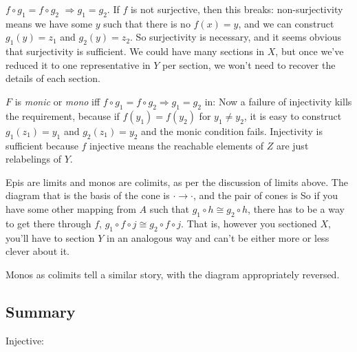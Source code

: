 \documentclass[11pt]{article}
\begin{document}

$f\circ g_1 = f\circ g_2$ $\Rightarrow g_1 = g_2$. If $f$ is not surjective, then
this breaks: non-surjectivity means we have some $y$ such that there is no $f(x)=y$,
and we can construct $g_1(y)=z_1$ and $g_2(y)=z_2$. So surjectivity is necessary, and
it seems obvious that surjectivity is sufficient. We could have many sections in $X$, but
once we've reduced it to one representative in $Y$ per section, we won't need to recover
the details of each section.

$F$ is {\em monic} or {\em mono} iff $f \circ g_1 = f \circ g_2 \Rightarrow g_1 = g_2$ in:
Now a failure of injectivity kills the requirement, because if $f(y_1)=f(y_2)$ for
$y_1\neq y_2$, it is easy to construct $g_1(z_1)=y_1$ and $g_2(z_1)=y_2$ and the monic
condition fails. Injectivity is sufficient because $f$ injective means the reachable
elements of $Z$ are just relabelings of $Y$.

Epis are limits and monos are colimits, as per the discussion of limits above. The diagram
that is the basis of the cone is $\cdot \to \cdot$, and the pair of cones is
So if you have some other mapping from $A$ such that $g_1\circ h\cong g_2\circ h$,
there has to be a way to get there through $f$, $g_1\circ f\circ j \cong g_2\circ f\circ
j$. That is, however you sectioned $X$, you'll have to section $Y$ in an analogous way and
can't be either more or less clever about it.

Monos as colimits tell a similar story, with the diagram appropriately reversed.

\subsection{Summary}

Injective:
\end{document}
